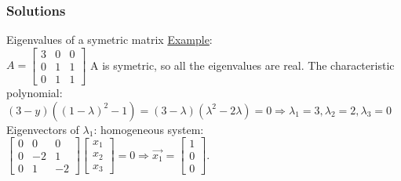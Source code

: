 \begin{frame}
	\frametitle{Solutions}
	\begin{block}{Eigenvalues of a symetric matrix}
		\underline{Example}:\\
		$A=\begin{bmatrix}
		3 & 0 & 0\\
		0 & 1 & 1\\
		0 & 1 & 1
		\end{bmatrix}$ A is symetric, so all the eigenvalues are real. The characteristic polynomial:\\
		$(3-y)((1-\lambda)^2-1)=(3-\lambda)(\lambda^2-2\lambda)=0 \Rightarrow \lambda_1=3, \lambda_2=2, \lambda_3=0$\\
		Eigenvectors of $\lambda_1$: homogeneous system:\\
		$\begin{bmatrix}
		0 & 0& 0\\
		0 & -2 & 1\\
		0 & 1 & -2
		\end{bmatrix}\begin{bmatrix}
		x_1\\x_2\\x_3
		\end{bmatrix}=0 \Rightarrow \overrightarrow{x_1}=\begin{bmatrix}
		1\\0\\0
		\end{bmatrix}$.
	\end{block}
\end{frame}

